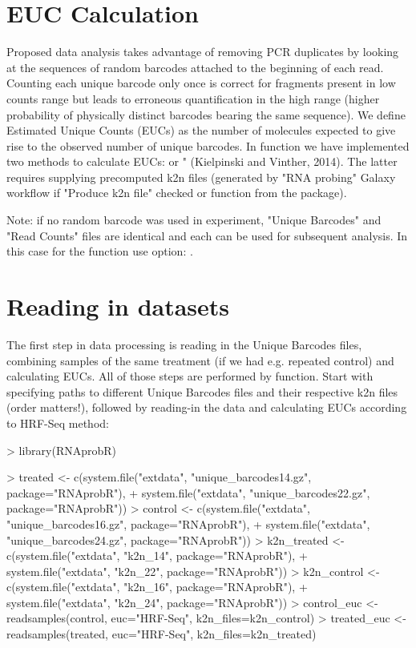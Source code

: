 \documentclass{article}
\begin{document}
\section{EUC Calculation}

Proposed data analysis takes advantage of removing PCR duplicates by looking at the sequences of random barcodes attached to the beginning of each read. Counting each unique barcode only once is correct for fragments present in low counts range but leads to erroneous quantification in the high range (higher probability of physically distinct barcodes bearing the same sequence). We define Estimated Unique Counts (EUCs) as the number of molecules expected to give rise to the observed number of unique barcodes. In function  we have implemented two methods to calculate EUCs:  \cite{Fu2011} or " (Kielpinski and Vinther, 2014). The latter requires supplying precomputed k2n files (generated by "RNA probing" Galaxy workflow if "Produce k2n file" checked or  function from the package).

Note: if no random barcode was used in experiment, "Unique Barcodes" and "Read Counts" files are identical and each can be used for subsequent analysis. In this case for the  function use option: .

\section{Reading in datasets}

The first step in data processing is reading in the Unique Barcodes files, combining samples of the same treatment (if we had e.g. repeated control) and calculating EUCs. All of those steps are performed by  function.
Start with specifying paths to different Unique Barcodes files and their respective k2n files (order matters!), followed by reading-in the data and calculating EUCs according to HRF-Seq method:

\begin{Schunk}
\begin{Sinput}
> library(RNAprobR)
\end{Sinput}
\end{Schunk}

\begin{Schunk}
\begin{Sinput}
> treated <- c(system.file("extdata", "unique_barcodes14.gz", package="RNAprobR"),
+ system.file("extdata", "unique_barcodes22.gz", package="RNAprobR"))
> control <- c(system.file("extdata", "unique_barcodes16.gz", package="RNAprobR"),
+ system.file("extdata", "unique_barcodes24.gz", package="RNAprobR"))
> k2n_treated <- c(system.file("extdata", "k2n_14", package="RNAprobR"),
+ system.file("extdata", "k2n_22", package="RNAprobR"))
> k2n_control <- c(system.file("extdata", "k2n_16", package="RNAprobR"),
+ system.file("extdata", "k2n_24", package="RNAprobR"))
> control_euc <- readsamples(control, euc="HRF-Seq", k2n_files=k2n_control)
> treated_euc <- readsamples(treated, euc="HRF-Seq", k2n_files=k2n_treated)
\end{Sinput}
\end{Schunk}
\end{document}
